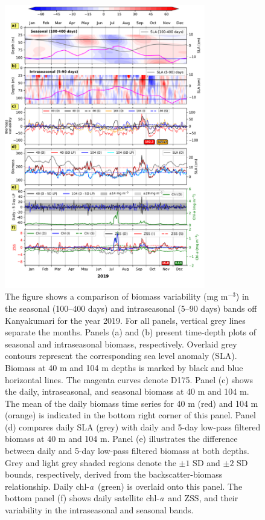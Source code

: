 \documentclass[12pt,a4paper]{article}
\newcommand{\chla}{chl-{\emph{a}}}
\begin{document}
\begin{figure}[htbp]
		\centering
		\includegraphics[width=0.78\textwidth]{./fig_s04_biomass_intra_2019_kanyakumari.pdf}
		\caption{The figure shows a comparison of biomass variability (mg m$^{-3}$) in the seasonal (100–400 days) and intraseasonal (5–90 days) bands off Kanyakumari for the year 2019. For all panels, vertical grey lines separate the months. Panels (a) and (b) present time-depth plots of seasonal and intraseasonal biomass, respectively. Overlaid grey contours represent the corresponding sea level anomaly (SLA). Biomass at 40 m and 104 m depths is marked by black and blue horizontal lines. The magenta curves denote D175. Panel (c) shows the daily, intraseasonal, and seasonal biomass at 40 m and 104 m. The mean of the daily biomass time series for 40 m (red) and 104 m (orange) is indicated in the bottom right corner of this panel. Panel (d) compares daily SLA (grey) with daily and 5-day low-pass filtered biomass at 40 m and 104 m. Panel (e) illustrates the difference between daily and 5-day low-pass filtered biomass at both depths. Grey and light grey shaded regions denote the $\pm 1$ SD and $\pm 2$ SD bounds, respectively, derived from the backscatter-biomass relationship. Daily \chla\ (green) is overlaid onto this panel. The bottom panel (f) shows daily satellite \chla\ and ZSS, and their variability in the intraseasonal and seasonal bands.}
		\label{fig:biomass_intra_2019_kanyakumari}

\end{figure}
\end{document}
